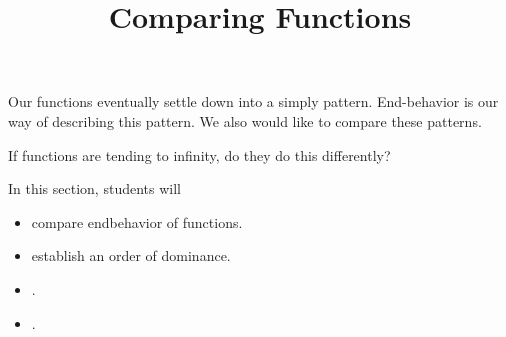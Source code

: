 \documentclass{ximera}
\title{Comparing Functions}
\begin{document}
\begin{abstract}
\end{abstract}
\maketitle







Our functions eventually settle down into a simply pattern.  End-behavior is our way of describing this pattern.   We also would like to compare these patterns.


If functions are tending to infinity, do they do this differently?





















\begin{sectionOutcomes}
In this section, students will 

\begin{itemize}
\item compare endbehavior of functions.
\item establish an order of dominance.
\item .
\item .
\end{itemize}
\end{sectionOutcomes}
\end{document}
